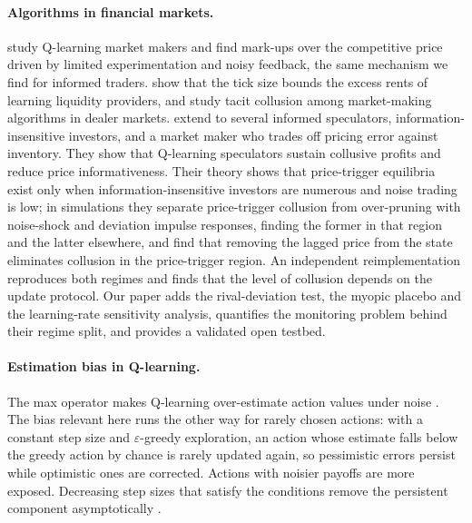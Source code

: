 \paragraph{Algorithms in financial markets.} \citet{colliard2026} study
Q-learning market makers and find mark-ups over the competitive price driven
by limited experimentation and noisy feedback, the same mechanism we find for
informed traders. \citet{cartea2022} show that the tick size bounds the
excess rents of learning liquidity providers, and \citet{cont2024} study
tacit collusion among market-making algorithms in dealer markets.
\citet{dou2025} extend \citet{kyle1985} to several informed speculators,
information-insensitive investors, and a market maker who trades off pricing
error against inventory. They show that Q-learning speculators sustain
collusive profits and reduce price informativeness. Their theory shows that
price-trigger equilibria exist only when information-insensitive investors
are numerous and noise trading is low; in simulations they separate
price-trigger collusion from over-pruning with noise-shock and deviation
impulse responses, finding the former in that region and the latter
elsewhere, and find that removing the lagged price from the state
eliminates collusion in the price-trigger region. An
independent reimplementation \citep{esquinas2026} reproduces both regimes and
finds that the level of collusion depends on the update protocol. Our paper
adds the rival-deviation test, the myopic placebo and the learning-rate
sensitivity analysis, quantifies the monitoring problem behind their regime
split, and provides a validated open testbed.

\paragraph{Estimation bias in Q-learning.} The max operator makes Q-learning
over-estimate action values under noise \citep{thrun1993,vanhasselt2010}. The
bias relevant here runs the other way for rarely chosen actions: with a
constant step size and $\varepsilon$-greedy exploration, an action whose
estimate falls below the greedy action by chance is rarely updated again, so
pessimistic errors persist while optimistic ones are corrected. Actions with
noisier payoffs are more exposed. Decreasing step sizes that satisfy the
\citet{robbins1951} conditions remove the persistent component
asymptotically \citep{evendar2003}.
